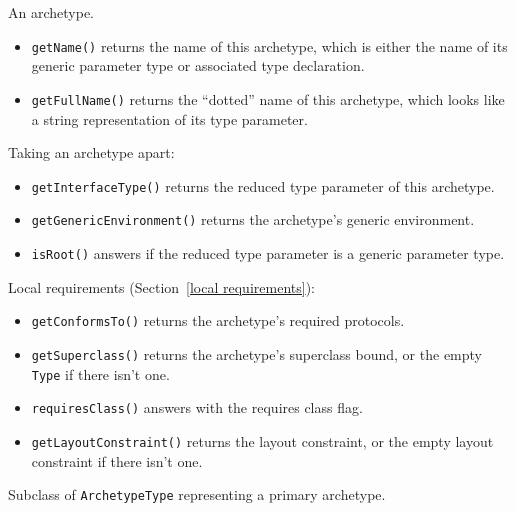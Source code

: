 \documentclass[../generics]{subfiles}
\begin{document}
An archetype.
\begin{itemize}
\item \texttt{getName()} returns the name of this archetype, which is either the name of its generic parameter type or associated type declaration.
\item \texttt{getFullName()} returns the ``dotted'' name of this archetype, which looks like a string representation of its type parameter.
\end{itemize}
Taking an archetype apart:
\begin{itemize}
\item \texttt{getInterfaceType()} returns the reduced type parameter of this archetype.
\item \texttt{getGenericEnvironment()} returns the archetype's generic environment.
\item \texttt{isRoot()} answers if the reduced type parameter is a generic parameter type.
\end{itemize}
Local requirements (Section~\ref{local requirements}):
\begin{itemize}
\item \texttt{getConformsTo()} returns the archetype's required protocols.
\item \texttt{getSuperclass()} returns the archetype's superclass bound, or the empty \texttt{Type} if there isn't one.
\item \texttt{requiresClass()} answers with the requires class flag.
\item \texttt{getLayoutConstraint()} returns the layout constraint, or the empty layout constraint if there isn't one.
\end{itemize}

Subclass of \texttt{ArchetypeType} representing a primary archetype.
\end{document}

